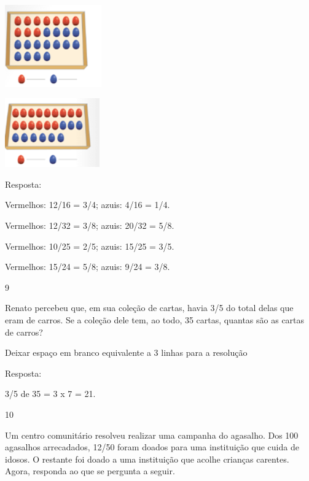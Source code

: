 \begin{mdframed}[linewidth=2pt,linecolor=salmao,roundcorner=2pt]
\begin{escolha}
{{\begin{escolha}
\item
\end{escolha}

\includegraphics[width=1.63347in,height=1.39179in]{media/image120.png}

\begin{escolha}
\item
\end{escolha}

\includegraphics[width=1.60014in,height=1.16677in]{media/image121.png}

Resposta:

\begin{escolha}
\item
  Vermelhos: 12/16 = 3/4; azuis: 4/16 = 1/4.
\item
  Vermelhos: 12/32 = 3/8; azuis: 20/32 = 5/8.
\item
  Vermelhos: 10/25 = 2/5; azuis: 15/25 = 3/5.
\item
  Vermelhos: 15/24 = 5/8; azuis: 9/24 = 3/8.
\end{escolha}

\num{9}

Renato percebeu que, em sua coleção de cartas, havia 3/5 do total delas
que eram de carros. Se a coleção dele tem, ao todo, 35 cartas, quantas são
as cartas de carros?

Deixar espaço em branco equivalente a 3 linhas para a resolução

Resposta:

3/5 de 35 = 3 x 7 = 21.

\num{10}

Um centro comunitário resolveu realizar uma campanha do agasalho. Dos
100 agasalhos arrecadados, 12/50 foram doados para uma instituição que
cuida de idosos. O restante foi doado a uma instituição que acolhe
crianças carentes. Agora, responda ao que se pergunta a seguir.

}}
\end{escolha}
\end{mdframed}
